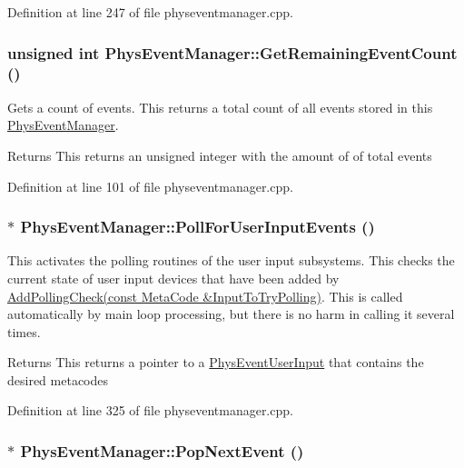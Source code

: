 Definition at line 247 of file physeventmanager.cpp.\hypertarget{classPhysEventManager_ab14d238e7abe9919be8e2d9eef388b64}{
\subsubsection[{GetRemainingEventCount}]{\setlength{\rightskip}{0pt plus 5cm}unsigned int PhysEventManager::GetRemainingEventCount ()}}
\label{d5/dd7/classPhysEventManager_ab14d238e7abe9919be8e2d9eef388b64}


Gets a count of events. This returns a total count of all events stored in this \hyperlink{classPhysEventManager}{PhysEventManager}. \begin{DoxyReturn}{Returns}
This returns an unsigned integer with the amount of of total events 
\end{DoxyReturn}


Definition at line 101 of file physeventmanager.cpp.\hypertarget{classPhysEventManager_ac66ebe495e2a77d06803291711528db2}{
\subsubsection[{PollForUserInputEvents}]{ $\ast$ PhysEventManager::PollForUserInputEvents ()}}
\label{d5/dd7/classPhysEventManager_ac66ebe495e2a77d06803291711528db2}


This activates the polling routines of the user input subsystems. This checks the current state of user input devices that have been added by \hyperlink{classPhysEventManager_a1e99385441c5377a741561db581ef3ae}{AddPollingCheck(const MetaCode \&InputToTryPolling)}. This is called automatically by main loop processing, but there is no harm in calling it several times. \begin{DoxyReturn}{Returns}
This returns a pointer to a \hyperlink{classPhysEventUserInput}{PhysEventUserInput} that contains the desired metacodes 
\end{DoxyReturn}


Definition at line 325 of file physeventmanager.cpp.\hypertarget{classPhysEventManager_a3122b32172326ac32cfecc828b820977}{
\subsubsection[{PopNextEvent}]{ $\ast$ PhysEventManager::PopNextEvent ()}}
\label{d5/dd7/classPhysEventManager_a3122b32172326ac32cfecc828b820977}



